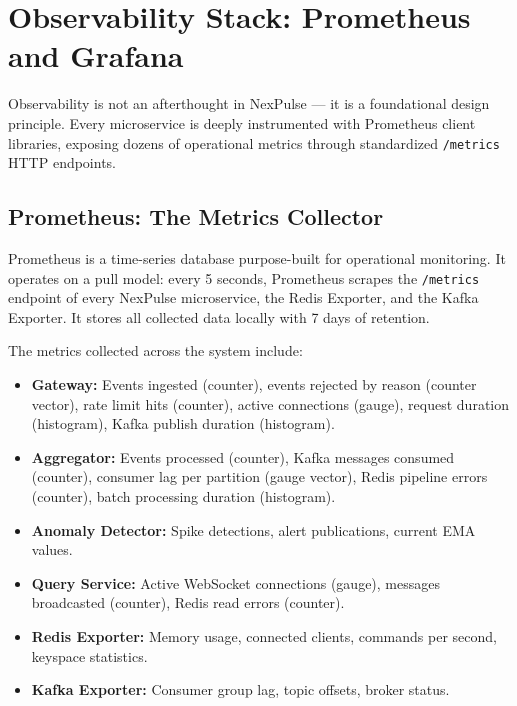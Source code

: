 \documentclass[12pt,a4paper]{article}
\begin{document}
\section{Observability Stack: Prometheus and Grafana}

Observability is not an afterthought in NexPulse --- it is a foundational design principle. Every microservice is deeply instrumented with Prometheus client libraries, exposing dozens of operational metrics through standardized \texttt{/metrics} HTTP endpoints.

\subsection{Prometheus: The Metrics Collector}

Prometheus is a time-series database purpose-built for operational monitoring. It operates on a pull model: every 5 seconds, Prometheus scrapes the \texttt{/metrics} endpoint of every NexPulse microservice, the Redis Exporter, and the Kafka Exporter. It stores all collected data locally with 7 days of retention.

The metrics collected across the system include:

\begin{itemize}[leftmargin=2em]
    \item \textbf{Gateway:} Events ingested (counter), events rejected by reason (counter vector), rate limit hits (counter), active connections (gauge), request duration (histogram), Kafka publish duration (histogram).
    \item \textbf{Aggregator:} Events processed (counter), Kafka messages consumed (counter), consumer lag per partition (gauge vector), Redis pipeline errors (counter), batch processing duration (histogram).
    \item \textbf{Anomaly Detector:} Spike detections, alert publications, current EMA values.
    \item \textbf{Query Service:} Active WebSocket connections (gauge), messages broadcasted (counter), Redis read errors (counter).
    \item \textbf{Redis Exporter:} Memory usage, connected clients, commands per second, keyspace statistics.
    \item \textbf{Kafka Exporter:} Consumer group lag, topic offsets, broker status.
\end{itemize}
\end{document}
